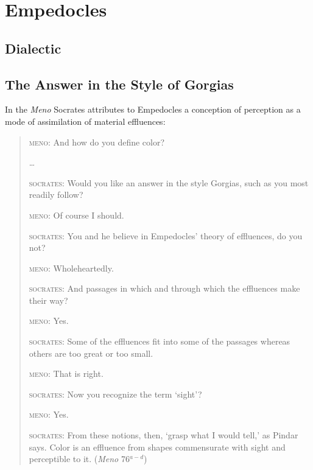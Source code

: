 \chapter{Empedocles} %
\label{cha:empedocles}

\section{Dialectic} %
\label{sec:dialectic}


\section{The Answer in the Style of Gorgias} %
\label{sec:the_answer_in_the_style_of_gorgias}

In the \emph{Meno} Socrates attributes to Empedocles a conception of perception as a mode of assimilation of material effluences:
\begin{quotation}
    \textsc{meno}: And how do you define color?
    
    \ldots
    
    \textsc{socrates}: Would you like an answer in the style Gorgias, such as you most readily follow?
    
    \textsc{meno}: Of course I should.
    
    \textsc{socrates}: You and he believe in Empedocles' theory of effluences, do you not?
    
    \textsc{meno}: Wholeheartedly.
    
    \textsc{socrates}: And passages in which and through which the effluences make their way?
    
    \textsc{meno}: Yes.
    
    \textsc{socrates}: Some of the effluences fit into some of the passages whereas others are too great or too small.
    
    \textsc{meno}: That is right.
    
    \textsc{socrates}: Now you recognize the term `sight'?
    
    \textsc{meno}: Yes.
    
    \textsc{socrates}: From these notions, then, `grasp what I would tell,' as Pindar says. Color is an effluence from shapes commensurate with sight and perceptible to it. (\emph{Meno} 76\( ^{a-d} \))
\end{quotation}

